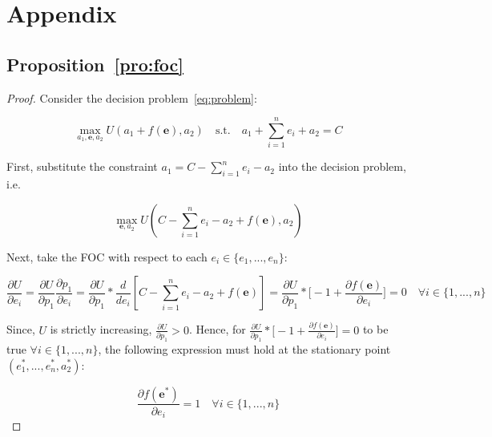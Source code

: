 \newpage
\appendix
\section{Appendix}
\subsection{Proposition~\ref{pro:foc}}
\label{app:foc}
\begin{proof}
Consider the decision problem~\ref{eq:problem}:

$$\max_{a_1,\mathbf{e},a_2} U(a_1+f(\mathbf{e}),a_2)
\quad \text{s.t.} \quad a_1 + \sum_{i=1}^n e_i + a_2 = C$$

First, substitute the constraint $a_1=C-\sum_{i=1}^n e_i-a_2$ into the decision problem, i.e.

$$\max_{\mathbf{e},a_2} U(C-\sum_{i=1}^n e_i-a_2+f(\mathbf{e}),a_2)$$

Next, take the FOC with respect to each $e_i\in\{e_1,...,e_n\}$:

$$\frac{\partial U}{\partial e_i}=\frac{\partial U}{\partial p_1}\frac{\partial p_1}{\partial e_i}=\frac{\partial U}{\partial p_1}*\frac{d}{de_i}[C-\sum_{i=1}^n e_i-a_2+f(\mathbf{e})]=\frac{\partial U}{\partial p_1}*\bigg[-1+\frac{\partial f(\mathbf{e})}{\partial e_i}\bigg]=0\quad\forall i\in\{1,...,n\}$$

Since, $U$ is strictly increasing, $\frac{\partial U}{\partial p_1}>0$. Hence, for $\frac{\partial U}{\partial p_1}*\bigg[-1+\frac{\partial f(\mathbf{e})}{\partial e_i}\bigg]=0$ to be true $\forall i\in\{1,...,n\}$, the following expression must hold at the stationary point $(e^*_1,...,e^*_n,a^*_2)$:

$$\frac{\partial f(\mathbf{e^*})}{\partial e_i}=1\quad\forall i\in\{1,...,n\}$$

\end{proof}
